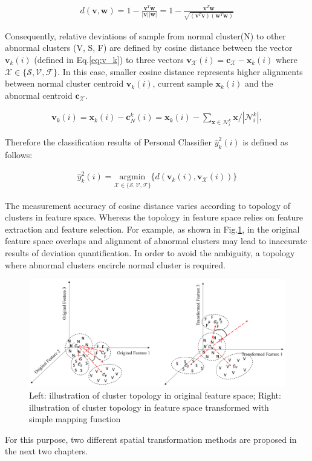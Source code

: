 \begin{align}
\label{eq:cosine}
d(\mathbf{v},\mathbf{w})= 1 - \frac{\mathbf{v}^T\mathbf{w}}{|\mathbf{v}||\mathbf{w}|}=1 - \frac{\mathbf{v}^T\mathbf{w}}{\sqrt{(\mathbf{v}^T\mathbf{v})(\mathbf{w}^T\mathbf{w})}}
\end{align}

Consequently, relative deviations of sample from normal cluster(N) to other abnormal clusters (V, S, F) are defined by cosine distance between the vector $\mathbf{v}_k(i)$ (defined in Eq.\ref{eq:v_k}) to three vectors $\mathbf{v}_{\mathcal{X}}(i)=\mathbf{c}_{\mathcal{X}}-\mathbf{x}_k(i)$ where $\mathcal{X} \in \{ \mathcal{S}, \mathcal{V}, \mathcal{F}\}$. In this case, smaller cosine distance represents higher alignments between normal cluster centroid $\mathbf{v}_k(i)$, current sample $\mathbf{x}_k(i)$ and the abnormal centroid $\mathbf{c}_{\mathcal{X}}$.


\begin{align}
\label{eq:v_k}
\mathbf{v}_k(i)=\mathbf{x}_k(i)-\mathbf{c}_N^k(i) = \mathbf{x}_k(i)- {\sum_{\mathbf{x} \in \mathcal{N}_i^k} \mathbf{x}}/{|\mathcal{N}_i^k|}, 
\end{align}

Therefore the classification results of Personal Classifier $\hat{y}^2_k(i)$ is defined as follows:

\begin{align}
\label{eq:personal_discrim}
\hat{y}^2_k(i) = \underset{\mathcal{X} \in \{ \mathcal{S}, \mathcal{V}, \mathcal{F} \}}{\text{argmin}}\{ d(\mathbf{v}_k(i),\mathbf{v}_{\mathcal{X}}(i)) \} 
\end{align}

The measurement accuracy of cosine distance varies according to topology of clusters in feature space. Whereas the topology in feature space relies on feature extraction and feature selection. For example, as shown in Fig.\ref{fig:topo1}, in the original feature space overlaps and alignment of abnormal clusters may lead to inaccurate results of deviation quantification. In order to avoid the ambiguity, a topology where abnormal clusters encircle normal cluster is required.

\begin{figure}[thpb]
\centering
\includegraphics[scale=.5]{Fig/topo1.png}
\caption{Left: illustration of cluster topology in original feature space; Right: illustration of cluster topology in feature space transformed with simple mapping function}
\label{fig:topo1}
\end{figure}

For this purpose, two different spatial transformation methods are proposed in the next two chapters.